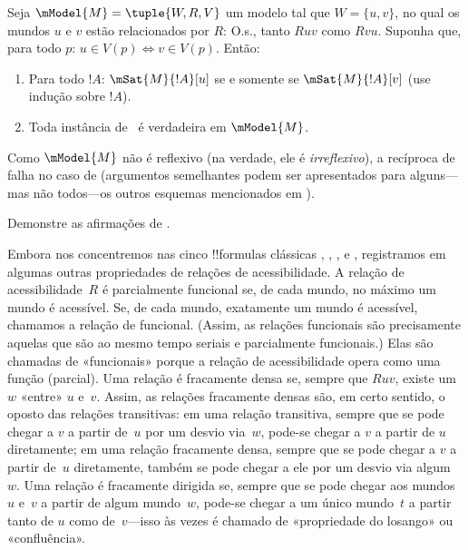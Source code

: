 \documentclass[../../../include/open-logic-section]{subfiles}
\begin{document}
\begin{prop}
  Seja $\mModel{M} = \tuple{W, R, V}$ um modelo tal que $W = \{u, v\}$, no
  qual os mundos $u$ e $v$ estão relacionados por $R$: O.s.\@, tanto $Ruv$
  como $Rvu$. Suponha que, para todo $p$: $u \in V(p) \Leftrightarrow v
  \in V(p)$. Então:
  \begin{enumerate}
  \item Para todo $!A$: $\mSat{M}{!A}[u]$ se e somente se
    $\mSat{M}{!A}[v]$ (use indução sobre $!A$).
  \item Toda instância de~ é verdadeira em $\mModel{M}$.
  \end{enumerate}
  Como $\mModel{M}$ não é reflexivo (na verdade, ele é
  \emph{irreflexivo}), a recíproca de  falha no caso
  de  (argumentos semelhantes podem ser apresentados para alguns---mas
  não todos---os outros esquemas mencionados em ).
\end{prop}

\begin{prob}
  Demonstre as afirmações de .
\end{prob}

Embora nos concentremos nas cinco !!{formula}s clássicas , ,
,  e , registramos em  algumas
outras propriedades de relações de acessibilidade. A relação de
acessibilidade~$R$ é parcialmente funcional se, de cada mundo, no máximo um
mundo é acessível. Se, de cada mundo, exatamente um mundo é acessível,
chamamos a relação de funcional. (Assim, as relações funcionais são
precisamente aquelas que são ao mesmo tempo seriais e parcialmente
funcionais.) Elas são chamadas de «funcionais» porque a relação de
acessibilidade opera como uma função (parcial). Uma relação é fracamente
densa se, sempre que $Ruv$, existe um~$w$ «entre» $u$ e~$v$. Assim, as
relações fracamente densas são, em certo sentido, o oposto das relações
transitivas: em uma relação transitiva, sempre que se pode chegar a $v$ a
partir de~$u$ por um desvio via~$w$, pode-se chegar a $v$ a partir de $u$
diretamente; em uma relação fracamente densa, sempre que se pode chegar a $v$
a partir de~$u$ diretamente, também se pode chegar a ele por um desvio via
algum~$w$. Uma relação é fracamente dirigida se, sempre que se pode chegar aos
mundos $u$ e~$v$ a partir de algum mundo~$w$, pode-se chegar a um único
mundo~$t$ a partir tanto de $u$ como de~$v$---isso às vezes é chamado de
«propriedade do losango» ou «confluência».
\end{document}
